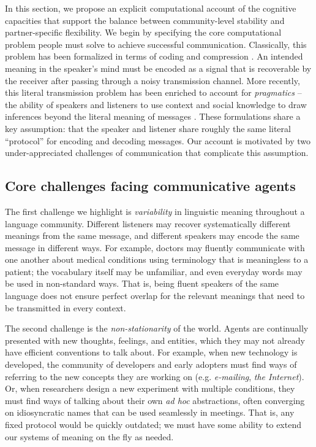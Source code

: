 
In this section, we propose an explicit computational account of the cognitive capacities that support the balance between community-level stability and partner-specific flexibility.
We begin by specifying the core computational problem people must solve to achieve successful communication.
Classically, this problem has been formalized in terms of coding and compression \cite{Shannon48}. 
An intended meaning in the speaker's mind must be encoded as a signal that is recoverable by the receiver after passing through a noisy transmission channel.
More recently, this literal transmission problem has been enriched to account for \emph{pragmatics} -- the ability of speakers and listeners to use context and social knowledge to draw inferences beyond the literal meaning of messages \cite{FrankeJager16_ProbabilisticPragmatics,goodman_pragmatic_2016}.
These formulations share a key assumption: that the speaker and listener share roughly the same literal ``protocol'' for encoding and decoding messages.
Our account is motivated by two under-appreciated challenges of communication that complicate this assumption. 

\subsection{Core challenges facing communicative agents}

The first challenge we highlight is \emph{variability} in linguistic meaning throughout a language community. 
Different listeners may recover systematically different meanings from the same message, and different speakers may encode the same message in different ways.
For example, doctors may fluently communicate with one another about medical conditions using terminology that is meaningless to a patient; the vocabulary itself may be unfamiliar, and even everyday words may be used in non-standard ways.
That is, being fluent speakers of the same language does not ensure perfect overlap for the relevant meanings that need to be transmitted in every context.

The second challenge is the \emph{non-stationarity} of the world. 
Agents are continually presented with new thoughts, feelings, and entities, which they may not already have efficient conventions to talk about.
For example, when new technology is developed, the community of developers and early adopters must find ways of referring to the new concepts they are working on (e.g. \emph{e-mailing}, \emph{the Internet}). 
Or, when researchers design a new experiment with multiple conditions, they must find ways of talking about their own \emph{ad hoc} abstractions, often converging on idiosyncratic names that can be used seamlessly in meetings.
That is, any fixed protocol would be quickly outdated; we must have some ability to extend our systems of meaning on the fly as needed.


